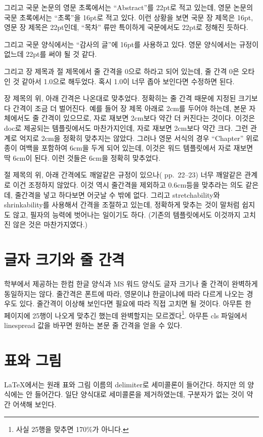 \documentclass[a4paper]{report}
\begin{document}
그리고 국문 논문의 영문 초록에서는 ``Abstract''를 22pt로
적고 있는데, 영문 논문의 국문 초록에서는 ``초록''을
16pt로 적고 있다. 이런 상황을 보면 국문 장 제목은
16pt, 영문 장 제목은 22pt인데, ``목차'' 류만 특이하게
국문에서도 22pt로 정해진 듯하다.

그리고 국문 양식에서는 ``감사의 글''에 16pt를 사용하고 있다.
영문 양식에서는 규정이 없느데 22pt를 써야 될 것 같다.

그리고 장 제목과 절 제목에서 줄 간격을 0으로 하라고
되어 있는데, 줄 간격 0은 오타인 것 같아서
1.0으로 해두었다. 혹시 1.0이 너무 좁아
보인다면 수정하면 된다.

장 제목의 위, 아래 간격은 나온대로 맞추었다.
정확히는 줄 간격 때문에 지정된 크기보다
간격이 조금 더 벌어진다. 예를 들어
장 제목 아래로 2cm를 두어야 하는데,
본문 자체에서도 줄 간격이 있으므로,
자로 재보면 2cm보다 약간 더 커진다는
것이다. 이것은 doc로 제공되는 템플릿에서도
마찬가지인데, 자로 재보면 2cm보다 약간 크다.
그런 관계로 억지로 2cm을 정확히 맞추지는 않았다.
그러나 영문 서식의 경우 ``Chapter'' 위로
종이 여백을 포함하여 6cm을 두게 되어 있는데,
이것은 워드 템플릿에서 자로 재보면
딱 6cm이 된다. 이런 것들은 6cm을 정확히 맞추었다.

절 제목의 위, 아래 간격에도 깨알같은 규정이
있으나(\cite{grad} pp.~22--23) 너무 깨알같은 관계로 이건 조정하지 않았다.
이것 역시 줄간격을 제외하고 0.6cm등을 맞추라는 의도
같은데, 줄간격을 넣고 하다보면 어긋날 수 밖에 없다.
그리고  stretchability와 shrinkability를
사용해서 간격을 조절하고 있는데, 정확하게 맞추는
것이 말처럼 쉽지도 않고,
필자의 능력에 벗어나는 일이기도 하다.
(기존의 템플릿에서도 이것까지 고치진
않은 것은 마찬가지였다.)

\section{글자 크기와 줄 간격}
학부에서 제공하는 한컴 한글 양식과 MS 워드 양식도
글자 크기나 줄 간격이 완벽하게 동일하지는 않다.
줄간격은 폰트에 따라, 영문이냐 한글이냐에 따라
다르게 나오는 경우도 있다. 줄간격이 이상해 보인다면
필요에 따라 직접 고치면 될 것이다.
아무튼 한 페이지에 25행이 나오게 맞추긴
했는데 완벽할지는 모르겠다\footnote{사실
25행을 맞추면 170\%가 아니다.}.
아무튼 cls 파일에서 linespread 값을
바꾸면 원하는 본문 줄 간격을
얻을 수 있다.

\section{표와 그림}
LaTeX에서는 원래 표와 그림 이름의 delimiter로 세미콜론이 들어간다.
하지만 \cite{grad}의 양식에는 안 들어간다.
일단 양식대로 세미콜론을 제거하였는데,
구분자가 없는 것이 약간 어색해 보인다.
\end{document}
